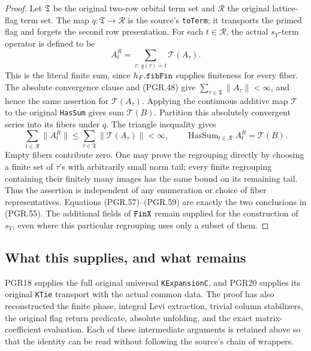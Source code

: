 \documentclass[11pt,a4paper]{article}
\numberwithin{equation}{section}
\theoremstyle{remark}\newtheorem{remark}[theorem]{Remark}
\begin{document}
\begin{proof}
Let \(\mathfrak T\) be the original two-row orbital term set
and \(\mathcal R\) the original lattice-flag term set.  The
map \(q:\mathfrak T\to\mathcal R\) is the source's
\texttt{to\allowbreak Term}; it transports the primed flag and forgets the
second row presentation.  For each \(t\in\mathcal R\),
the actual \(s_Y\)-term operator is defined to be
\[
             A^R_t=\sum_{\tau:\ q(\tau)=t}\mathcal T(A_\tau).
\tag{PGR.58}
\]
This is the literal finite sum, since \(h_F.\texttt{fib\allowbreak Fin}\)
supplies finiteness for every fiber.  The absolute convergence
clause and (PGR.48) give
\(\sum_{\tau\in\mathfrak T}\|A_\tau\|<\infty\),
and hence the same assertion for \(\mathcal T(A_\tau)\).
Applying the continuous additive map \(\mathcal T\) to the
original \texttt{Has\allowbreak Sum} gives sum \(\mathcal T(B)\).
Partition this absolutely convergent series into its fibers under
\(q\).  The triangle inequality gives
\[
 \sum_{t\in\mathcal R}\|A^R_t\|
       \leq\sum_{\tau\in\mathfrak T}\|\mathcal T(A_\tau)\|<\infty,
 \qquad
       \operatorname{HasSum}_{t\in\mathcal R}A^R_t=\mathcal T(B).
\tag{PGR.59}
\]
Empty fibers contribute zero.  One may prove the regrouping directly
by choosing a finite set of \(\tau\)'s with arbitrarily small
norm tail; every finite regrouping containing their finitely many
images has the same bound on its remaining tail.  Thus the assertion
is independent of any enumeration or choice of fiber representatives.
Equations (PGR.57)--(PGR.59) are exactly the two conclusions in
(PGR.55).  The additional fields of \(\texttt{Fin\allowbreak X}\) remain
supplied for the construction of \(s_Y\), even where this
particular regrouping uses only a subset of them.
\end{proof}

\subsection{What this supplies, and what remains}

PGR18 supplies the full original universal \texttt{KExpansion\allowbreak C},
and PGR20 supplies its original \texttt{KTie} transport with the
actual common data.  The proof has also reconstructed the finite
phase, integral Levi extraction, trivial column stabilizers, the
original flag return predicate, absolute unfolding, and the exact
matrix-coefficient evaluation.  Each of these intermediate arguments
is retained above so that the identity can be read without following
the source's chain of wrappers.
\end{document}
